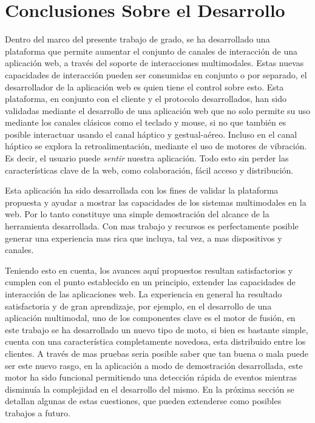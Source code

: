 \section{Conclusiones Sobre el Desarrollo} \label{sec:end_work}
Dentro del marco del presente trabajo de grado, se ha desarrollado una plataforma que permite aumentar el conjunto de canales de interacción de una aplicación web, a través del soporte de interacciones multimodales. Estas nuevas capacidades de interacción pueden ser consumidas en conjunto o por separado, el desarrollador de la aplicación web es quien tiene el control sobre esto. Esta plataforma, en conjunto con el cliente y el protocolo desarrollados, han sido validadas mediante el desarrollo de una aplicación web que no solo permite su uso mediante los canales clásicos como el teclado y mouse, si no que también es posible interactuar usando el canal háptico y gestual-aéreo. Incluso en el canal háptico se explora la retroalimentación, mediante el uso de motores de vibración. Es decir, el usuario puede \emph{sentir} nuestra aplicación. Todo esto sin perder las características clave de la web, como colaboración, fácil acceso y distribución.

Esta aplicación ha sido desarrollada con los fines de validar la plataforma propuesta y ayudar a mostrar las capacidades de los sistemas multimodales en la web. Por lo tanto constituye una simple demostración del alcance de la herramienta desarrollada. Con mas trabajo y recursos es perfectamente posible generar una experiencia mas rica que incluya, tal vez, a mas dispositivos y canales. 

Teniendo esto en cuenta, los avances aquí propuestos resultan satisfactorios y cumplen con el punto establecido en un principio, extender las capacidades de interacción de las aplicaciones web. La experiencia en general ha resultado satisfactoria y de gran aprendizaje, por ejemplo, en el desarrollo de una aplicación multimodal, uno de los componentes clave es el motor de fusión, en este trabajo se ha desarrollado un nuevo tipo de moto, si bien es bastante simple, cuenta con una característica completamente novedosa, esta distribuido entre los clientes. A través de mas pruebas seria posible saber que tan buena o mala puede ser este nuevo rasgo, en la aplicación a modo de demostración desarrollada, este motor ha sido funcional permitiendo una detección rápida de eventos mientras disminuía la complejidad en el desarrollo del mismo. En la próxima sección se detallan algunas de estas cuestiones, que pueden extenderse como posibles trabajos a futuro.

